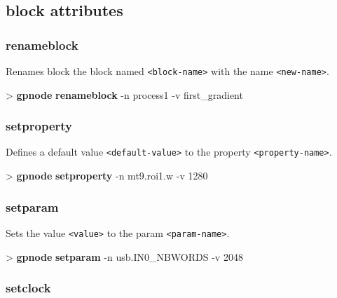 \documentclass[10pt,a4paper]{article}
\begin{document}
\subsection{block attributes}
\subsubsection{renameblock}

Renames block the block named \texttt{<block-name>} with the name \texttt{<new-name>}.

\begin{sampletitle}
> \textbf{gpnode} \textbf{renameblock} -n process1 -v first\_gradient
\end{sampletitle}

\subsubsection{setproperty}

Defines a default value \texttt{<default-value>} to the property \texttt{<property-name>}.

\begin{sampletitle}
> \textbf{gpnode} \textbf{setproperty} -n mt9.roi1.w -v 1280
\end{sampletitle}

\subsubsection{setparam}

Sets the value \texttt{<value>} to the param \texttt{<param-name>}.

\begin{sampletitle}
> \textbf{gpnode} \textbf{setparam} -n usb.IN0\_NBWORDS -v 2048
\end{sampletitle}

\subsubsection{setclock}
\end{document}
